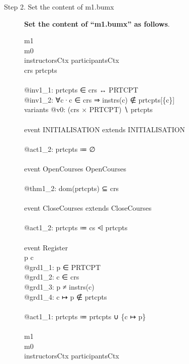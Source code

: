 \begin{description}
\item[Step 2. Set the content of m1.bumx] \textbf{Set the content of ``m1.bumx'' as follows}.
  \begin{center}
    \begin{Bcode}
      \ifplastex
      \Bmachine{} m1\\
      \Brefines{} m0\\
      \Bsees{} instructorsCtx participantsCtx \\
      \Bvariables{} crs prtcpts \\
      \Binvariants\\
      @inv1_1: prtcpts ∈ crs ↔ PRTCPT\\
      @inv1_2: ∀c·c ∈ crs ⇒ instrs(c) ∉ prtcpts[\{c\}]\\
      variants @v0: (crs × PRTCPT) ∖ prtcpts\\
      \Bevents\\
      event INITIALISATION extends INITIALISATION\\
      \Bthen\\
      @act1_2: prtcpts ≔ ∅\\
      \Bend\\
      event OpenCourses \Brefines{} OpenCourses\\
      \Bwhere\\
      \Btheorem{} @thm1_2: dom(prtcpts) ⊆ crs\\
      \Bend\\
      \Banticipated{} event CloseCourses extends CloseCourses\\
      \Bthen\\
      @act1_2: prtcpts ≔ cs ⩤ prtcpts\\
      \Bend\\
      \Bconvergent event Register \\
      \Bany{} p c \Bwhere \\
      @grd1_1: p ∈ PRTCPT\\
      @grd1_2: c ∈ crs\\
      @grd1_3: p ≠ instrs(c)\\
      @grd1_4: c ↦ p ∉ prtcpts\\
      \Bthen\\
      @act1_1: prtcpts ≔ prtcpts ∪ \{c ↦ p\}\\
      \Bend\\
      \Bend
      \else
      \Bmachine{} m1\\
      \Brefines{} m0\\
      \Bsees{} instructorsCtx participantsCtx \\

\end{Bcode}
\end{center}
\end{description}
